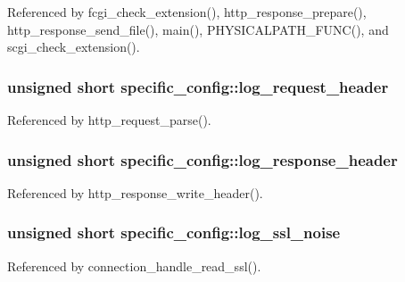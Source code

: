 Referenced by fcgi\-\_\-check\-\_\-extension(), http\-\_\-response\-\_\-prepare(), http\-\_\-response\-\_\-send\-\_\-file(), main(), P\-H\-Y\-S\-I\-C\-A\-L\-P\-A\-T\-H\-\_\-\-F\-U\-N\-C(), and scgi\-\_\-check\-\_\-extension().

\hypertarget{structspecific__config_a550854314852fe2314f42641581d9f64}{
\subsubsection[{log\-\_\-request\-\_\-header}]{\setlength{\rightskip}{0pt plus 5cm}unsigned short specific\-\_\-config\-::log\-\_\-request\-\_\-header}}\label{structspecific__config_a550854314852fe2314f42641581d9f64}


Referenced by http\-\_\-request\-\_\-parse().

\hypertarget{structspecific__config_ae224ee9b984bacadce9ea38403f72c0f}{
\subsubsection[{log\-\_\-response\-\_\-header}]{\setlength{\rightskip}{0pt plus 5cm}unsigned short specific\-\_\-config\-::log\-\_\-response\-\_\-header}}\label{structspecific__config_ae224ee9b984bacadce9ea38403f72c0f}


Referenced by http\-\_\-response\-\_\-write\-\_\-header().

\hypertarget{structspecific__config_a4482657ba9584a181c16310786b04ff9}{
\subsubsection[{log\-\_\-ssl\-\_\-noise}]{\setlength{\rightskip}{0pt plus 5cm}unsigned short specific\-\_\-config\-::log\-\_\-ssl\-\_\-noise}}\label{structspecific__config_a4482657ba9584a181c16310786b04ff9}


Referenced by connection\-\_\-handle\-\_\-read\-\_\-ssl().

